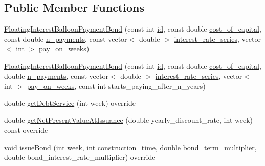 \subsection*{Public Member Functions}
\begin{DoxyCompactItemize}
\item 
\mbox{\hyperlink{classFloatingInterestBalloonPaymentBond_aa42f50447a3dd1bd6959e8c4bd0c2421_aa42f50447a3dd1bd6959e8c4bd0c2421}{Floating\+Interest\+Balloon\+Payment\+Bond}} (const int \mbox{\hyperlink{classBond_a7f75bcafbc16676ad6dbafbf40afae4a_a7f75bcafbc16676ad6dbafbf40afae4a}{id}}, const double \mbox{\hyperlink{classBond_ad98df7d28b398e620286f95ee085439b_ad98df7d28b398e620286f95ee085439b}{cost\+\_\+of\+\_\+capital}}, const double \mbox{\hyperlink{classBond_a4a227b6de2eeada118d82ab1633b1db8_a4a227b6de2eeada118d82ab1633b1db8}{n\+\_\+payments}}, const vector$<$ double $>$ \mbox{\hyperlink{classFloatingInterestBalloonPaymentBond_a36c73466753c976e513c6763f79f58ad_a36c73466753c976e513c6763f79f58ad}{interest\+\_\+rate\+\_\+series}}, vector$<$ int $>$ \mbox{\hyperlink{classBond_ae8dd46fcbf95c993460ffe4ea1f52739_ae8dd46fcbf95c993460ffe4ea1f52739}{pay\+\_\+on\+\_\+weeks}})
\item 
\mbox{\hyperlink{classFloatingInterestBalloonPaymentBond_a9732cbf82ecc484237071bb681f7dc63_a9732cbf82ecc484237071bb681f7dc63}{Floating\+Interest\+Balloon\+Payment\+Bond}} (const int \mbox{\hyperlink{classBond_a7f75bcafbc16676ad6dbafbf40afae4a_a7f75bcafbc16676ad6dbafbf40afae4a}{id}}, const double \mbox{\hyperlink{classBond_ad98df7d28b398e620286f95ee085439b_ad98df7d28b398e620286f95ee085439b}{cost\+\_\+of\+\_\+capital}}, double \mbox{\hyperlink{classBond_a4a227b6de2eeada118d82ab1633b1db8_a4a227b6de2eeada118d82ab1633b1db8}{n\+\_\+payments}}, const vector$<$ double $>$ \mbox{\hyperlink{classFloatingInterestBalloonPaymentBond_a36c73466753c976e513c6763f79f58ad_a36c73466753c976e513c6763f79f58ad}{interest\+\_\+rate\+\_\+series}}, vector$<$ int $>$ \mbox{\hyperlink{classBond_ae8dd46fcbf95c993460ffe4ea1f52739_ae8dd46fcbf95c993460ffe4ea1f52739}{pay\+\_\+on\+\_\+weeks}}, const int starts\+\_\+paying\+\_\+after\+\_\+n\+\_\+years)
\item 
double \mbox{\hyperlink{classFloatingInterestBalloonPaymentBond_a0009a0b12e0ebeb15952561513ddc901_a0009a0b12e0ebeb15952561513ddc901}{get\+Debt\+Service}} (int week) override
\item 
double \mbox{\hyperlink{classFloatingInterestBalloonPaymentBond_a90205e26e09eef1227f8c0671ca4fce2_a90205e26e09eef1227f8c0671ca4fce2}{get\+Net\+Present\+Value\+At\+Issuance}} (double yearly\+\_\+discount\+\_\+rate, int week) const override
\item 
void \mbox{\hyperlink{classFloatingInterestBalloonPaymentBond_a4cf110f320c92f5eca9aed952e0b527a_a4cf110f320c92f5eca9aed952e0b527a}{issue\+Bond}} (int week, int construction\+\_\+time, double bond\+\_\+term\+\_\+multiplier, double bond\+\_\+interest\+\_\+rate\+\_\+multiplier) override
\end{DoxyCompactItemize}
